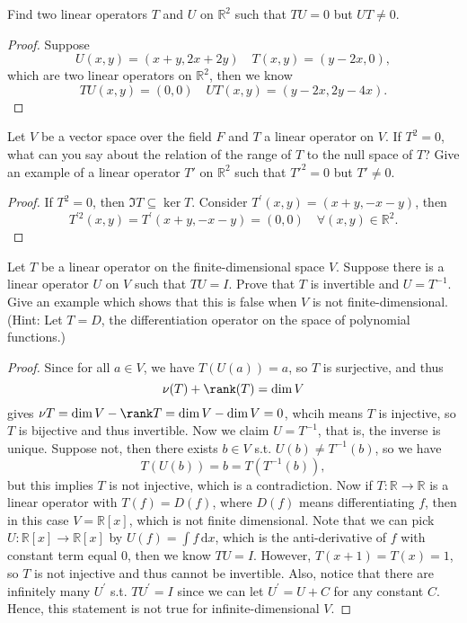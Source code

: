 \begin{problem*}
Find two linear operators \(T\) and \(U\) on \(\mathbb{R}^2\) such that \(TU = 0\) but \(UT \neq 0\).
\end{problem*}
\begin{proof}
    Suppose 
    \[
        U(x, y) = (x + y, 2x + 2y) \quad T(x, y) = (y - 2x, 0),
    \] which are two linear operators on \(\mathbb{R} ^2\), then we know
    \[
        TU(x, y) = (0, 0) \quad UT(x, y) = (y - 2x, 2y - 4x).
    \]
\end{proof}
\begin{problem*}
Let \(V\) be a vector space over the field \(F\) and \(T\) a linear operator on \(V\). If \(T^2 = 0\), what can you say about the relation of the range of \(T\) to the null space of \(T\)? Give an example of a linear operator \(T'\) on \(\mathbb{R}^2\) such that \(T'^2 = 0\) but \(T' \neq 0\).
\end{problem*}
\begin{proof}
    If \(T^2 = 0\), then \(\Im T \subseteq \ker T\). Consider \(T^{\prime} (x, y) = (x + y, -x - y)\), then
    \[
        T^{\prime2}(x, y) = T^{\prime} (x + y, -x - y) = (0, 0) \quad \forall (x, y) \in \mathbb{R} ^2.
    \]   
\end{proof}
\begin{problem*}
Let \(T\) be a linear operator on the finite-dimensional space \(V\). Suppose there is a linear operator \(U\) on \(V\) such that \(TU = I\). Prove that \(T\) is invertible and \(U = T^{-1}\). Give an example which shows that this is false when \(V\) is not finite-dimensional. (Hint: Let \(T = D\), the differentiation operator on the space of polynomial functions.)
\end{problem*}
\begin{proof}
    Since for all \(a \in V\), we have \(T(U(a)) = a\), so \(T\) is surjective, and thus 
    \[
        \nu (T) + \rank (T) = \dim V 
    \]  gives \(\nu T = \dim V - \rank T = \dim V - \dim V = 0\), whcih means \(T\) is injective, so \(T\) is bijective and thus invertible. Now we claim \(U = T^{-1} \), that is, the inverse is unique. Suppose not, then there exists \(b \in V\) s.t. \(U(b) \neq T^{-1}(b)\), so we have 
    \[
        T(U(b)) = b = T(T^{-1}(b)),
    \] but this implies \(T\) is not injective, which is a contradiction. Now if \(T:\mathbb{R} \to \mathbb{R} \) is a linear operator with \(T(f) = D(f)\), where \(D(f)\) means differentiating \(f\), then in this case \(V = \mathbb{R} [x]\), which is not finite dimensional. Note that we can pick \(U:\mathbb{R} [x] \to \mathbb{R} [x]\) by \(U(f) = \int f \, \mathrm{d}x \), which is the anti-derivative of \(f\) with constant term equal \(0\), then we know \(TU = I\). However, \(T(x + 1) = T(x) = 1\), so \(T\) is not injective and thus cannot be invertible. Also, notice that there are infinitely many \(U^{\prime} \) s.t. \(TU^{\prime}  = I\) since we can let \(U^{\prime} = U + C\) for any constant \(C\). Hence, this statement is not true for infinite-dimensional \(V\).             
\end{proof}

